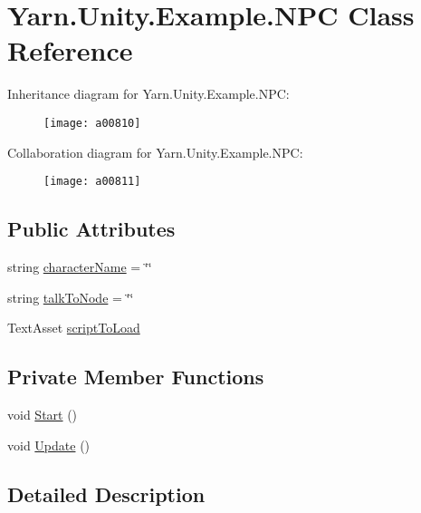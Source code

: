 \hypertarget{a00143}{\section{Yarn.\-Unity.\-Example.\-N\-P\-C Class Reference}
\label{a00143}
}


Inheritance diagram for Yarn.\-Unity.\-Example.\-N\-P\-C\-:
\nopagebreak
\begin{figure}[H]
\begin{center}
\leavevmode
\texttt{[image: a00810]}
\end{center}
\end{figure}


Collaboration diagram for Yarn.\-Unity.\-Example.\-N\-P\-C\-:
\nopagebreak
\begin{figure}[H]
\begin{center}
\leavevmode
\texttt{[image: a00811]}
\end{center}
\end{figure}
\subsection*{Public Attributes}
\begin{DoxyCompactItemize}
\item 
string \hyperlink{a00143_a418ea7095bd8201559ed392f07905ca3}{character\-Name} = \char`\"{}\char`\"{}
\item 
string \hyperlink{a00143_a64f4f1fb66b2046a674e3ebf3b9fdb56}{talk\-To\-Node} = \char`\"{}\char`\"{}
\item 
Text\-Asset \hyperlink{a00143_a63145fb6ddf357e604d71bac04ca8a60}{script\-To\-Load}
\end{DoxyCompactItemize}
\subsection*{Private Member Functions}
\begin{DoxyCompactItemize}
\item 
void \hyperlink{a00143_a0bf37075312ea87c2e329cc363a328a6}{Start} ()
\item 
void \hyperlink{a00143_ab1bea5afabd1c2e1e991063b1579d062}{Update} ()
\end{DoxyCompactItemize}


\subsection{Detailed Description}


